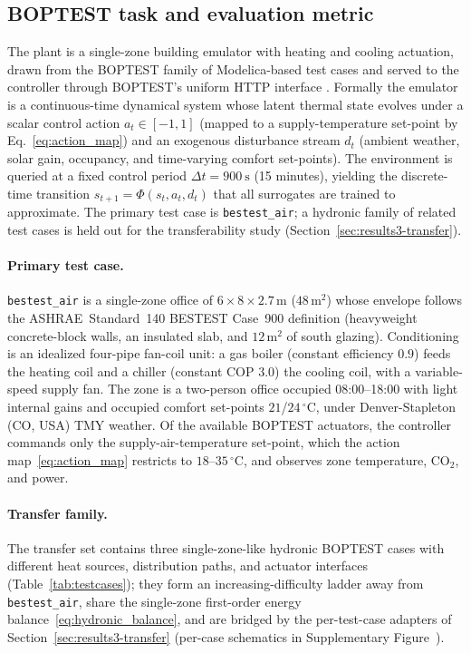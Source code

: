 \subsection{BOPTEST task and evaluation metric}\label{ssec:m-env}\label{ssec:m-pomdp}
The plant is a single-zone building emulator with heating and cooling actuation, drawn from the
BOPTEST family of Modelica-based test cases \citep{Blum2021BOPTEST,Wetter2014Modelica}
and served to the controller through BOPTEST's uniform HTTP interface
\citep{Arroyo2021GymBOPTEST}. Formally the emulator is a continuous-time
dynamical system whose latent thermal state evolves under a scalar control action
$a_t\in[-1,1]$ (mapped to a supply-temperature set-point by Eq.~\eqref{eq:action_map}) and an exogenous disturbance stream $d_t$ (ambient weather,
solar gain, occupancy, and time-varying comfort set-points). The environment is queried
at a fixed control period $\Delta t = \SI{900}{\second}$ (15 minutes), yielding the
discrete-time transition $s_{t+1}=\Phi(s_t,a_t,d_t)$ that all surrogates are trained
to approximate. The primary test case is \texttt{bestest\_air}; a hydronic family of
related test cases is held out for the transferability study (Section~\ref{sec:results3-transfer}).

\paragraph{Primary test case.} \texttt{bestest\_air} is a single-zone office of $6\times8\times2.7$\,m ($48$\,m$^2$) whose envelope follows the ASHRAE~Standard~140 BESTEST Case~900 definition (heavyweight concrete-block walls, an insulated slab, and $12$\,m$^2$ of south glazing). Conditioning is an idealized four-pipe fan-coil unit: a gas boiler (constant efficiency $0.9$) feeds the heating coil and a chiller (constant COP $3.0$) the cooling coil, with a variable-speed supply fan. The zone is a two-person office occupied 08:00--18:00 with light internal gains and occupied comfort set-points $21$/$24\,^\circ$C, under Denver-Stapleton (CO, USA) TMY weather. Of the available BOPTEST actuators, the controller commands only the supply-air-temperature set-point, which the action map~\eqref{eq:action_map} restricts to $18$--$35\,^\circ$C, and observes zone temperature, CO$_2$, and power.

\paragraph{Transfer family.} The transfer set contains three single-zone-like hydronic BOPTEST cases with different heat sources, distribution paths, and actuator interfaces (Table~\ref{tab:testcases}); they form an increasing-difficulty ladder away from \texttt{bestest\_air}, share the single-zone first-order energy balance~\eqref{eq:hydronic_balance}, and are bridged by the per-test-case adapters of Section~\ref{sec:results3-transfer} (per-case schematics in Supplementary Figure~).

